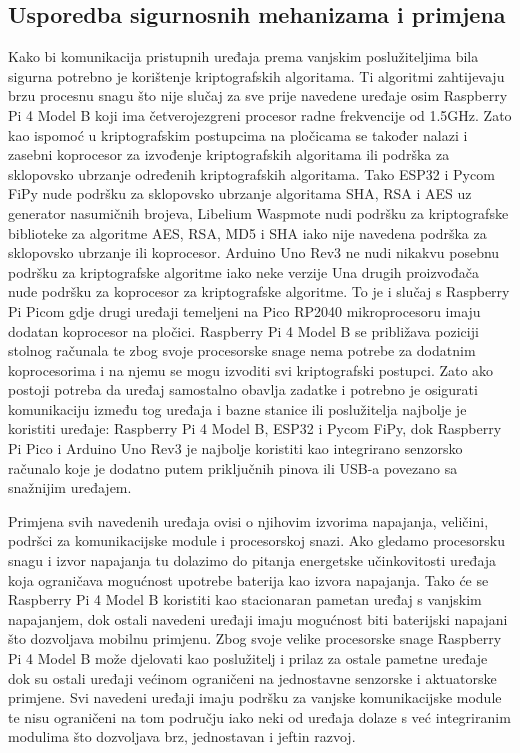 \documentclass[times, utf8, diplomski]{fer}
\begin{document}
\subsection{Usporedba sigurnosnih mehanizama i primjena}
Kako bi komunikacija pristupnih uređaja prema vanjskim poslužiteljima bila sigurna potrebno je korištenje kriptografskih algoritama. Ti algoritmi zahtijevaju brzu procesnu snagu što nije slučaj za sve prije navedene uređaje osim Raspberry Pi 4 Model B koji ima četverojezgreni procesor radne frekvencije od 1.5GHz. Zato kao ispomoć u kriptografskim postupcima na pločicama se također nalazi i zasebni koprocesor za izvođenje kriptografskih algoritama ili podrška za sklopovsko ubrzanje određenih kriptografskih algoritama. Tako ESP32 i Pycom FiPy nude podršku za sklopovsko ubrzanje algoritama SHA, RSA i AES uz generator nasumičnih brojeva, Libelium Waspmote nudi podršku za kriptografske biblioteke za algoritme AES, RSA, MD5 i SHA iako nije navedena podrška za sklopovsko ubrzanje ili koprocesor. Arduino Uno Rev3 ne nudi nikakvu posebnu podršku za kriptografske algoritme iako neke verzije Una drugih proizvođača nude podršku za koprocesor za kriptografske algoritme. To je i slučaj s Raspberry Pi Picom gdje drugi uređaji temeljeni na Pico RP2040 mikroprocesoru imaju dodatan koprocesor na pločici. Raspberry Pi 4 Model B se približava poziciji stolnog računala te zbog svoje procesorske snage nema potrebe za dodatnim koprocesorima i na njemu se mogu izvoditi svi kriptografski postupci. Zato ako postoji potreba da uređaj samostalno obavlja zadatke i potrebno je osigurati komunikaciju između tog uređaja i bazne stanice ili poslužitelja najbolje je koristiti uređaje: Raspberry Pi 4 Model B, ESP32 i Pycom FiPy, dok Raspberry Pi Pico i Arduino Uno Rev3 je najbolje koristiti kao integrirano senzorsko računalo koje je dodatno putem priključnih pinova ili USB-a povezano sa snažnijim uređajem.

Primjena svih navedenih uređaja ovisi o njihovim izvorima napajanja, veličini, podršci za komunikacijske module i procesorskoj snazi. Ako gledamo procesorsku snagu i izvor napajanja tu dolazimo do pitanja energetske učinkovitosti uređaja koja ograničava mogućnost upotrebe baterija kao izvora napajanja. Tako će se Raspberry Pi 4 Model B koristiti kao stacionaran pametan uređaj s vanjskim napajanjem, dok ostali navedeni uređaji imaju mogućnost biti baterijski napajani što dozvoljava mobilnu primjenu. Zbog svoje velike procesorske snage Raspberry Pi 4 Model B može djelovati kao poslužitelj i prilaz za ostale pametne uređaje dok su ostali uređaji većinom ograničeni na jednostavne senzorske i aktuatorske primjene. Svi navedeni uređaji imaju podršku za vanjske komunikacijske module te nisu ograničeni na tom području iako neki od uređaja dolaze s već integriranim modulima što dozvoljava brz, jednostavan i jeftin razvoj.
\end{document}
